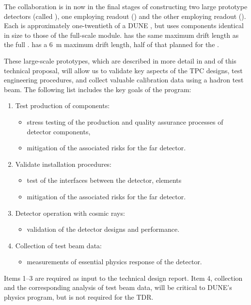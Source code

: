 The collaboration is in now in the final stages of constructing two large prototype detectors (called ), one employing \single readout () and the other employing \dual readout (). Each is approximately one-twentieth of a DUNE , but uses components identical in size to those of the full-scale module.  has the same \spmaxdrift maximum drift length as the full .  has a \SI{6}{m} maximum drift length, half of that planned for the . 

These large-scale prototypes, which are described in more detail in 
\voltitlespfd and \voltitledpfd %
of this technical proposal, will allow us to validate key aspects of the TPC designs, test engineering procedures, and collect valuable calibration data using a hadron test beam. The following list includes the key goals of the  program:
\begin{enumerate}
\item Test production of components:
\begin{itemize}
\item stress testing of the production and quality
assurance processes of detector components,
\item mitigation of the associated risks for the far detector.
\end{itemize}
\item Validate installation procedures:
\begin{itemize}
\item test of the interfaces between the detector,
elements
\item mitigation of the associated risks for the far detector.
\end{itemize}
\item Detector operation with cosmic rays:
\begin{itemize}
\item validation of the detector designs and
performance.
\end{itemize}
\item Collection of test beam data:
\begin{itemize}
\item measurements of essential physics response of the detector.
\end{itemize}
\end{enumerate}

Items \numrange{1}{3} are required as input to the technical design report. Item 4, collection and the corresponding analysis of test beam data, will be critical to DUNE's physics program, but is not required for the TDR.

